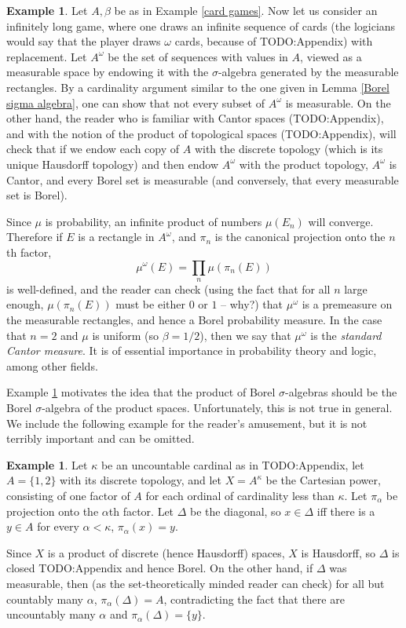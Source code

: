 \documentclass[12pt]{book}
\newcommand{\dfn}[1]{\emph{#1}\index{#1}}
\theoremstyle{definition}
\newtheorem{example}[theorem]{Example}
\begin{document}
\begin{example}
\label{cantor measure}
Let $A, \beta$ be as in Example \ref{card games}.
Now let us consider an infinitely long game, where one draws an infinite sequence of cards (the logicians would say that the player draws $\omega$ cards, because of TODO:Appendix) with replacement.
Let $A^\omega$ be the set of sequences with values in $A$, viewed as a measurable space by endowing it with the $\sigma$-algebra generated by the measurable rectangles.
By a cardinality argument similar to the one given in Lemma \ref{Borel sigma algebra}, one can show that not every subset of $A^\omega$ is measurable.
On the other hand, the reader who is familiar with Cantor spaces (TODO:Appendix), and with the notion of the product of topological spaces (TODO:Appendix), will check that if we endow each copy of $A$ with the discrete topology (which is its unique Hausdorff topology) and then endow $A^\omega$ with the product topology, $A^\omega$ is Cantor, and every Borel set is measurable (and conversely, that every measurable set is Borel).

Since $\mu$ is probability, an infinite product of numbers $\mu(E_n)$ will converge. Therefore if $E$ is a rectangle in $A^\omega$, and $\pi_n$ is the canonical projection onto the $n$th factor,
$$\mu^\omega(E) = \prod_n \mu(\pi_n(E))$$
is well-defined, and the reader can check (using the fact that for all $n$ large enough, $\mu(\pi_n(E))$ must be either $0$ or $1$ -- why?) that $\mu^\omega$ is a premeasure on the measurable rectangles, and hence a Borel probability measure.
In the case that $n = 2$ and $\mu$ is uniform (so $\beta = 1/2$), then we say that $\mu^\omega$ is the \dfn{standard Cantor measure}.
It is of essential importance in probability theory and logic, among other fields.
\end{example}

Example \ref{cantor measure} motivates the idea that the product of Borel $\sigma$-algebras should be the Borel $\sigma$-algebra of the product spaces.
Unfortunately, this is not true in general.
We include the following example for the reader's amusement, but it is not terribly important and can be omitted.

\begin{example}
Let $\kappa$ be an uncountable cardinal as in TODO:Appendix, let $A = \{1, 2\}$ with its discrete topology, and let $X = A^\kappa$ be the Cartesian power, consisting of one factor of $A$ for each ordinal of cardinality less than $\kappa$. Let $\pi_\alpha$ be projection onto the $\alpha$th factor.
Let $\Delta$ be the diagonal, so $x \in \Delta$ iff there is a $y \in A$ for every $\alpha < \kappa$, $\pi_\alpha(x) = y$.

Since $X$ is a product of discrete (hence Hausdorff) spaces, $X$ is Hausdorff, so $\Delta$ is closed TODO:Appendix and hence Borel.
On the other hand, if $\Delta$ was measurable, then (as the set-theoretically minded reader can check) for all but countably many $\alpha$, $\pi_\alpha(\Delta) = A$, contradicting the fact that there are uncountably many $\alpha$ and $\pi_\alpha(\Delta) = \{y\}$.
\end{example}
\end{document}
